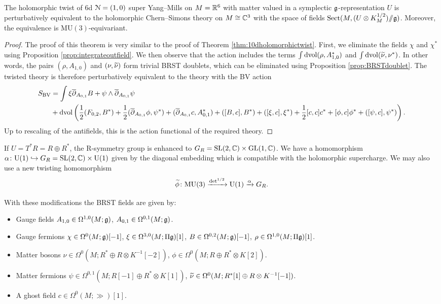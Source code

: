 \documentclass[10pt, oneside]{article}
\newcommand{\MU}{\mathrm{MU}}
\newcommand{\Sect}{\mathrm{Sect}}
\renewcommand{\U}{\mathrm{U}}
\newcommand{\ham}{/\!\!/}
\begin{document}
\begin{theorem}
The holomorphic twist of 6d $\mathcal N=(1, 0)$ super Yang--Mills on $M=\mathbb R^6$ with matter valued in a symplectic $\mathfrak g$-representation $U$ is perturbatively equivalent to the holomorphic Chern--Simons theory on $M\cong \mathbb C^3$ with the space of fields $\Sect(M, (U\otimes K_M^{1/2})\ham \fg)$. Moreover, the equivalence is $\MU(3)$-equivariant.
\label{thm:6dholomorphictwist}
\end{theorem}
\begin{proof}
The proof of this theorem is very similar to the proof of Theorem \ref{thm:10dholomorphictwist}. First, we eliminate the fields $\chi$ and $\chi^*$ using Proposition \ref{prop:integrateoutfield}.  We then observe that the action includes the terms $\int \operatorname{dvol}  (\rho, A_{1,0}^*)$ and $\int \operatorname{dvol} (\widetilde{\nu}, \nu^*)$.  In other words, the pairs $(\rho, A_{1,0})$ and $(\nu, \widetilde{\nu})$ form trivial BRST doublets, which can be eliminated using Proposition \ref{prop:BRSTdoublet}. The twisted theory is therefore perturbatively equivalent to the theory with the BV action 
\begin{align*}
 S_{\mathrm{BV}} &= \int \xi \overline{\partial}_{A_{0,1}} B  + \psi \wedge \overline{\partial}_{A_{0,1}} \psi \\
 &+ \operatorname{dvol}\left(\frac 12 (F_{0,2}, B^*) + \frac 12 (\overline{\partial}_{A_{0,1}} \phi, \psi^*) +  (\overline{\partial}_{A_{0, 1}} c, A_{0, 1}^*) + ([B, c], B^*) + ([\xi, c], \xi^*) + \frac{1}{2}[c, c]c^* +  [\phi, c] \phi^* + ([\psi, c],\psi^*)\right).
\end{align*}
Up to rescaling of the antifields, this is the action functional of the required theory.
\end{proof}

If $U=T^*R=R\oplus R^*$, the R-symmetry group is enhanced to $G_R=\mathrm{SL}(2, \mathbb C)\times \mathrm{GL}(1, \mathbb C)$. We have a homomorphism $\alpha\colon \U(1)\hookrightarrow G_R=\SL(2, \CC)\times \U(1)$ given by the diagonal embedding which is compatible with the holomorphic supercharge. We may also use a new twisting homomorphism
\[\Tilde{\phi}\colon\MU(3)\xrightarrow{\det^{1/2}}\U(1)\xrightarrow{\alpha} G_R.\]

With these modifications the BRST fields are given by:
\begin{itemize}
\item Gauge fields $A_{1, 0} \in \Omega^{1, 0}(M; \mathfrak g)$, $A_{0, 1}\in\Omega^{0, 1}(M; \mathfrak g)$.
\item Gauge fermions $\chi\in\Omega^0(M; \mathfrak g)[-1]$, $\xi\in\Omega^{3, 0}(M; \Pi\mathfrak g)[1]$, $B\in\Omega^{0, 2}(M; \mathfrak g)[-1]$, $\rho\in\Omega^{1, 0}(M; \Pi\mathfrak g)[1]$.
\item Matter bosons $\nu\in\Omega^0(M; R^*\oplus R\otimes K^{-1}[-2])$, $\phi\in\Omega^0(M; R\oplus R^*\otimes K[2])$.
\item Matter fermions $\psi\in \Omega^{0, 1}(M; R[-1]\oplus R^*\otimes K[1])$, $\widetilde{\nu}\in\Omega^0(M; R^*[1]\oplus R\otimes K^{-1}[-1])$.
\item A ghost field $c\in \Omega^0(M; \gg)[1]$.
\end{itemize}
\end{document}
